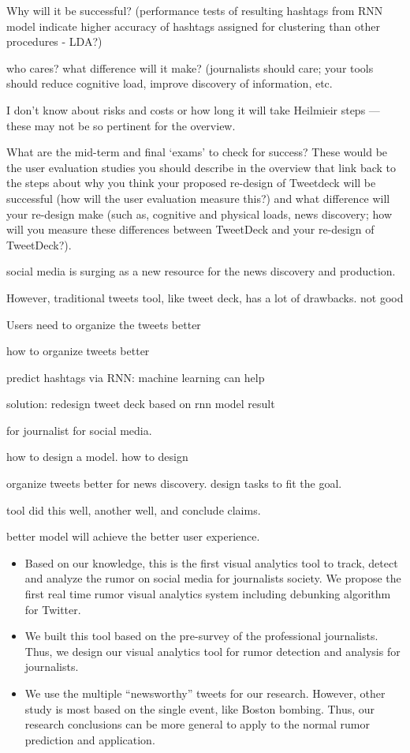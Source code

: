 Why will it be successful? (performance tests of resulting hashtags from RNN model indicate higher accuracy of hashtags assigned for clustering than other procedures - LDA?)

who cares? what difference will it make?  (journalists should care; your tools should reduce cognitive load, improve discovery of information, etc.

I don’t know about risks and costs or how long it will take Heilmieir steps — these may not be so pertinent for the overview.

What are the mid-term and final ‘exams' to check for success?  These would be the user evaluation studies you should describe in the overview that link back to the steps about why you think your proposed re-design of Tweetdeck will be successful (how will the user evaluation measure this?) and what difference will your re-design make (such as, cognitive and physical loads, news discovery; how will you measure these differences between TweetDeck and your re-design of TweetDeck?).



social media is surging as a new resource for the news discovery and production. 

However, traditional tweets tool, like tweet deck, has a lot of drawbacks.  not good

Users need to organize the tweets better

how to organize tweets better

predict hashtags via RNN: machine learning can help

solution: redesign tweet deck based on rnn model result

for journalist for social media. 

how to design a model. how to design 



organize tweets better for news discovery. design tasks to fit the goal. 

tool did this well, another well, and conclude claims. 


better model will achieve the better user experience.  



\begin{itemize}
  \item Based on our knowledge, this is the first visual analytics tool to track, detect and analyze the rumor on social media for journalists society. We propose the first real time rumor visual analytics system including debunking algorithm for Twitter.
  
  \item We built this tool based on the pre-survey of the professional journalists. Thus, we design our visual analytics tool for rumor detection and analysis for journalists. 
  
  \item We use the multiple ``newsworthy” tweets for our research. However, other study is most based on the single event, like Boston bombing. Thus, our research conclusions can be more general to apply to the normal rumor prediction and application. 
\end{itemize}


